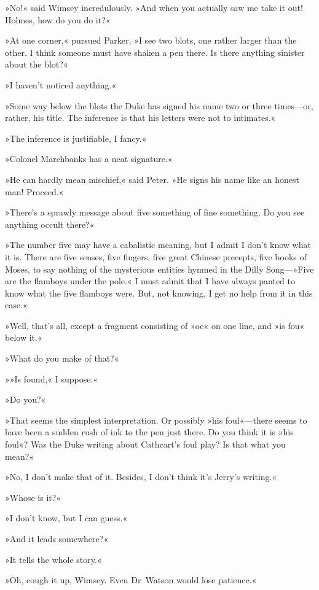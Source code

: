»No!« said Wimsey incredulously. »And when you actually saw me take it out! Holmes, how do you do it?«

»At one corner,« pursued Parker, »I see two blots, one rather larger than the other. I think someone must have shaken a pen there. Is there anything sinister about the blot?«

»I haven't noticed anything.«

»Some way below the blots the Duke has signed his name two or three times—or, rather, his title. The inference is that his letters were not to intimates.«

»The inference is justifiable, I fancy.«

»Colonel Marchbanks has a neat signature.«

»He can hardly mean mischief,« said Peter. »He signs his name like an honest man! Proceed.«

»There's a sprawly message about five something of fine something. Do you see anything occult there?«

»The number five may have a cabalistic meaning, but I admit I don't know what it is. There are five senses, five fingers, five great Chinese precepts, five books of Moses, to say nothing of the mysterious entities hymned in the Dilly Song—»Five are the flamboys under the pole.« I must admit that I have always panted to know what the five flamboys were. But, not knowing, I get no help from it in this case.«

»Well, that's all, except a fragment consisting of »oe« on one line, and »is fou\longdash« below it.«

»What do you make of that?«

»»Is found,« I suppose.«

»Do you?«

»That seems the simplest interpretation. Or possibly »his foul«—there seems to have been a sudden rush of ink to the pen just there. Do you think it is »his foul«? Was the Duke writing about Cathcart's foul play? Is that what you mean?«

»No, I don't make that of it. Besides, I don't think it's Jerry's writing.«

»Whose is it?«

»I don't know, but I can guess.«

»And it leads somewhere?«

»It tells the whole story.«

»Oh, cough it up, Wimsey. Even Dr~Watson would lose patience.«

